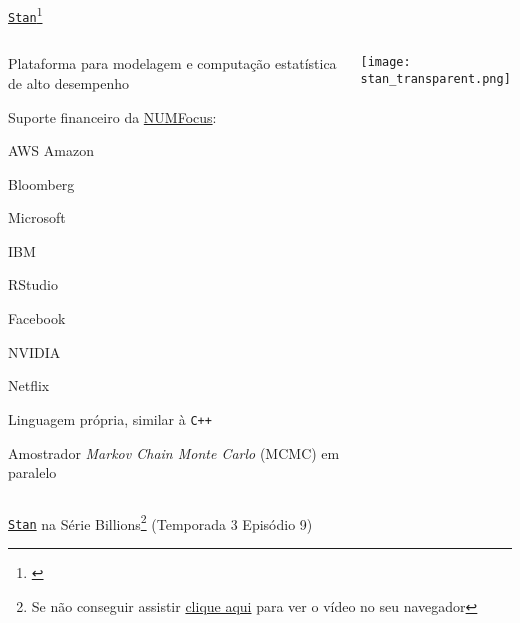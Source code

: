 \begin{frame}{\href{https://mc-stan.org}{\texttt{Stan}}\footnote{\textcite{carpenterStanProbabilisticProgramming2017}}}
	\begin{columns}
		\begin{column}{0.8\textwidth}
			\begin{vfilleditems}
				\small
				\item Plataforma para modelagem e computação estatística de alto desempenho
				\item Suporte financeiro da \href{https://numfocus.org/}{NUMFocus}:
				\begin{vfilleditems}
					\footnotesize
					\item AWS Amazon
					\item Bloomberg
					\item Microsoft
					\item IBM
					\item RStudio
					\item Facebook
					\item NVIDIA
					\item Netflix
				\end{vfilleditems}
				\small
				\item Linguagem própria, similar à \texttt{C++}
				\item Amostrador \textit{Markov Chain Monte Carlo} (MCMC) em paralelo
			\end{vfilleditems}
		\end{column}
		\begin{column}{0.2\textwidth}
			\centering
			\texttt{[image: stan\_transparent.png]}
		\end{column}
	\end{columns}
\end{frame}

\begin{frame}{\href{https://mc-stan.org}{\texttt{Stan}} na Série Billions\footnote{Se não conseguir assistir \href{https://github.com/storopoli/Estatistica-Bayesiana/blob/master/images/stan_billions_subtitled.mp4?raw=true}{clique aqui} para ver o vídeo no seu navegador} (Temporada 3 Episódio 9)}
	\centering
\end{frame}

